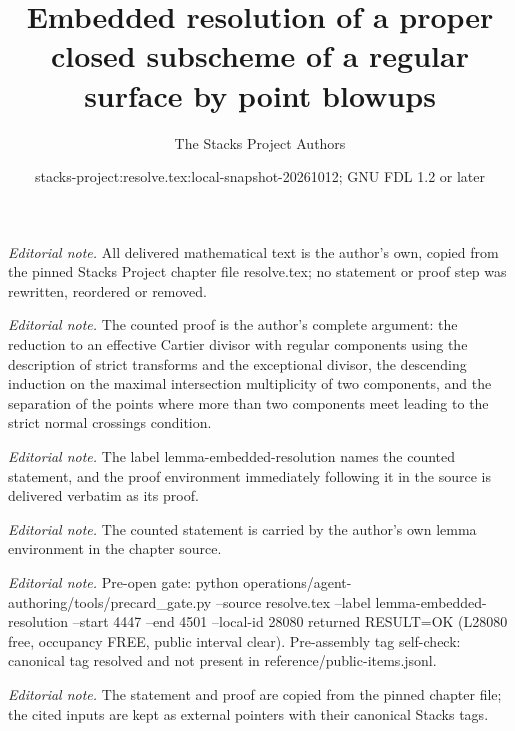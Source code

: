 \documentclass[10pt,a4paper]{amsart}
\title{Embedded resolution of a proper closed subscheme of a regular surface by point blowups}
\author{The Stacks Project Authors}
\date{stacks-project:resolve.tex:local-snapshot-20261012; GNU FDL 1.2 or later}
\theoremstyle{plain}
\theoremstyle{definition}
\theoremstyle{remark}
\numberwithin{equation}{subsection}
\begin{document}
\maketitle
\noindent\textit{Editorial note.} All delivered mathematical text is the author's own, copied from the pinned Stacks Project chapter file resolve.tex; no statement or proof step was rewritten, reordered or removed.\par\medskip
\noindent\textit{Editorial note.} The counted proof is the author's complete argument: the reduction to an effective Cartier divisor with regular components using the description of strict transforms and the exceptional divisor, the descending induction on the maximal intersection multiplicity of two components, and the separation of the points where more than two components meet leading to the strict normal crossings condition.\par\medskip
\noindent\textit{Editorial note.} The label lemma-embedded-resolution names the counted statement, and the proof environment immediately following it in the source is delivered verbatim as its proof.\par\medskip
\noindent\textit{Editorial note.} The counted statement is carried by the author's own lemma environment in the chapter source.\par\medskip
\noindent\textit{Editorial note.} Pre-open gate: python operations/agent-authoring/tools/precard\_gate.py --source resolve.tex --label lemma-embedded-resolution --start 4447 --end 4501 --local-id 28080 returned RESULT=OK (L28080 free, occupancy FREE, public interval clear). Pre-assembly tag self-check: canonical tag resolved and not present in reference/public-items.jsonl.\par\medskip
\noindent\textit{Editorial note.} The statement and proof are copied from the pinned chapter file; the cited inputs are kept as external pointers with their canonical Stacks tags.\par\medskip
\end{document}
